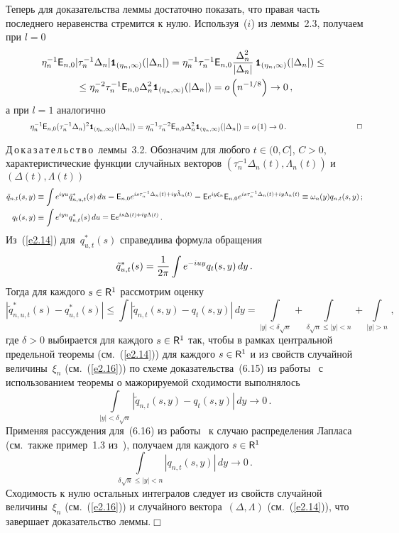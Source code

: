 Теперь для доказательства леммы достаточно показать, что правая часть последнего неравенства стремится к нулю. 
Используя~($i$) из леммы~2.3, получаем при $l=0$
\begin{multline*}
\eta_n^{-1}{{\sf E}}_{n,0}|\tau_n^{-1}\Delta_n| {\mbox{{\small \tt {1}}\hspace{-1.5mm}{\tt 1}}}_{(\eta_n,\infty)}(|\Delta_n|)=
\eta_n^{-1}\tau_n^{-1}{{\sf E}}_{n,0}\displaystyle\frac{\displaystyle \Delta_n^2\mathstrut}{\displaystyle |\Delta_n|\mathstrut}\, {\mbox{{\small \tt {1}}\hspace{-1.5mm}{\tt 1}}}_{(\eta_n,\infty)}(|\Delta_n|)\leq{}
\\
{}
\leq\eta_n^{-2}\tau_n^{-1}{{\sf E}}_{n,0}\Delta_n^2 {\mbox{{\small \tt {1}}\hspace{-1.5mm}{\tt 1}}}_{(\eta_n,\infty)}(|\Delta_n|)= o\left(n^{-1/8}\right)\to 0\,,
\end{multline*}
а при $l=1$ аналогично
\begin{equation*}
\quad\quad\quad\eta_n^{-1}{{\sf E}}_{n,0}(\tau_n^{-1}\Delta_n)^2 {\mbox{{\small \tt {1}}\hspace{-1.5mm}{\tt 1}}}_{(\eta_n,\infty)}(|\Delta_n|)
=
\eta_n^{-1}\tau_n^{-2}{{\sf E}}_{n,0}\Delta_n^2 {\mbox{{\small \tt {1}}\hspace{-1.5mm}{\tt 1}}}_{(\eta_n,\infty)}(|\Delta_n|)= o\left(1\right) \to 0\,.
\quad\quad\quad\quad\quad\quad\quad\quad\quad\Box
\end{equation*}



\medskip

\noindent
Д\,о\,к\,а\,з\,а\,т\,е\,л\,ь\,с\,т\,в\,о~леммы~3.2.
Обозначим для любого $t\in(0,C]$, $C>0$, характеристические функции случайных векторов 
$(\tau_n^{-1} \Delta_n(t),\Lambda_n(t))$ и $(\Delta(t),\Lambda(t))$
\begin{align*}
\tilde q_{n,t}(s,y)&\equiv\int e^{iyu}\tilde q_{n,u,t}^{*}(s)\,du
={{\sf E}}_{n,0} e^{is\tau_n^{-1}\Delta_n(t)+iy\tilde\Lambda_n(t)}
={{\sf E}}e^{iy\xi_n}{{\sf E}}_{n,0} e^{is\tau_n^{-1}\Delta_n(t)+iy\Lambda_n(t)}
\equiv \omega_n(y)q_{n,t}(s,y)\,;
\\
q_{t}(s,y)&\equiv\int e^{iyu} q_{u,t}^{*}(s)\,du={{\sf E}} e^{is\Delta(t)+iy\Lambda(t)}\,.
\end{align*}
Из~(\ref{e2.14}) для~$q_{u,t}^{*}(s)$ справедлива формула обращения
$$
\tilde q_{u,t}^{*}(s)=\displaystyle\frac{\displaystyle 1\mathstrut}{\displaystyle 2\pi\mathstrut}\int e^{-iuy}q_{t}(s,y)\,dy\,.
$$
Тогда для каждого $s\in{\sf R}^1$ рассмотрим оценку
\begin{equation*}
\left|\tilde q_{n,u,t}^{*}(s)-q_{u,t}^{*}(s)  \right|\leq\int \left| 
\tilde q_{n,t}(s,y) - q_{t}(s,y) \right|\,dy=
\int\limits_{|y|<\delta\sqrt n}+\int\limits_{\delta\sqrt{n}\leq|y|<n}+\int\limits_{|y|>n}\,,
\end{equation*}
где $\delta>0$ выбирается для каждого $s\in{\sf R}^1$ так, чтобы в рамках центральной предельной теоремы 
(см.~(\ref{e2.14})) для каждого $s\in{\sf R}^1$ и из свойств случайной величины~$\xi_n$ 
(см.~(\ref{e2.16})) по схеме доказательства~(6.15) из работы~\cite{2ben} 
с использованием теоремы о мажорируемой сходимости выполнялось
$$
\int\limits_{|y|<\delta\sqrt n} \left|\tilde q_{n,t}(s,y) - q_{t}(s,y) \right|\,dy\rightarrow 0\,.
$$
Применяя рассуждения для~(6.16) из работы~\cite{2ben} к случаю распределения Лапласа (см.\ 
также пример~1.3 из~\cite{6ben}), получаем для каждого $s\in{\sf R}^1$
$$
\int\limits_{\delta\sqrt{n}\leq|y|<n} \left| q_{n,t}(s,y)\right|\,dy \longrightarrow 0\,.
$$
Сходимость к нулю остальных интегралов следует из свойств случайной величины~$\xi_n$ (см.~(\ref{e2.16})) 
и случайного вектора~$(\Delta,\Lambda)$ (см.~(\ref{e2.14})), что завершает доказательство леммы.\hfill$\Box$


